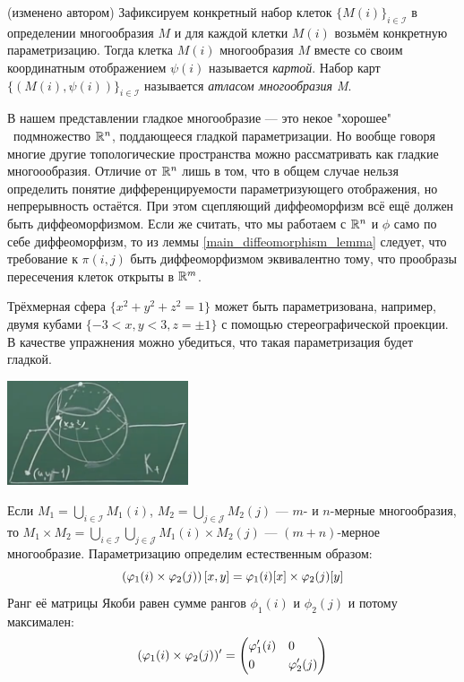 \begin{definition} (изменено автором)
	Зафиксируем конкретный набор клеток $\{M(i)\}_{i \in \mathcal I}$ в определении многообразия $M$ и для каждой клетки $M(i)$ возьмём конкретную параметризацию.
	Тогда клетка $M(i)$ многообразия $M$ вместе со своим координатным отображением $\psi(i)$ называется \textit{картой}. Набор карт $\{(M(i), \psi(i))\}_{i \in \mathcal I}$ называется \textit{атласом многообразия M}.
\end{definition}

\begin{anote}
	В нашем представлении гладкое многообразие --- это некое "хорошее" \ подмножество $\mathbb{R}^n$, поддающееся гладкой параметризации. Но вообще говоря многие другие топологические пространства можно рассматривать как гладкие многоообразия. Отличие от $\mathbb{R}^n$ лишь в том, что в общем случае нельзя определить понятие дифференцируемости параметризующего отображения, но непрерывность остаётся. При этом сцепляющий диффеоморфизм всё ещё должен быть диффеоморфизмом. Если же считать, что мы работаем с $\mathbb{R}^n$ и $\phi$ само по себе диффеоморфизм, то из леммы \ref{main_diffeomorphism_lemma} следует, что требование к $\pi(i,j)$ быть диффеоморфизмом эквивалентно тому, что прообразы пересечения клеток открыты в $\mathbb{R}^m$.
\end{anote}

\begin{example}
	Трёхмерная сфера $\{x^2 + y^2 + z^2 = 1\}$ может быть параметризована, например, двумя кубами $\{-3 < x, y < 3, z = \pm1\}$ с помощью стереографической проекции. В качестве упражнения можно убедиться, что такая параметризация будет гладкой.
	\begin{center}
		\includegraphics[width=0.4\textwidth]{images/sphere_manifold.png}
	\end{center}
\end{example}

\begin{example}
	Если $M_1 = \bigcup_{i \in \mathcal I} M_1(i)$, $M_2 = \bigcup_{j \in \mathcal J} M_2(j)$ --- $m$- и $n$-мерные многообразия, то $M_1 \times M_2 = \bigcup_{i \in \mathcal I} \bigcup_{j \in \mathcal J} M_1(i) \times M_2(j)$ --- $(m+n)$-мерное многообразие. Параметризацию определим естественным образом:
	\[
		\left(\varphi_1(i) \times \varphi_2(j)\right)[x, y] = \varphi_1(i)[x] \times \varphi_2(j)[y]
	\]
	Ранг её матрицы Якоби равен сумме рангов $\phi_1(i)$ и $\phi_2(j)$ и потому максимален:
	\[
		 (\varphi_1(i) \times \varphi_2(j))' =
		 \left(\begin{aligned}
			&{\varphi_1'(i)}& &{0}
			\\
			&{0}& &{\varphi_2'(j)}
		\end{aligned}\right)
	\]
\end{example}

